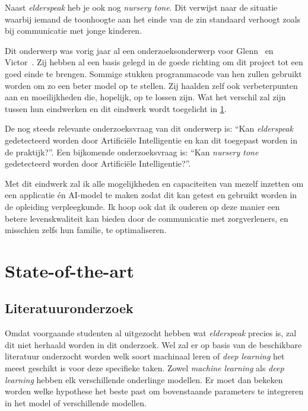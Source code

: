 Naast \textit{elderspeak} heb je ook nog \textit{nursery tone}. Dit verwijst naar de situatie waarbij iemand de toonhoogte aan het einde van de zin standaard verhoogt zoals bij communicatie met jonge kinderen.

Dit onderwerp was vorig jaar al een onderzoeksonderwerp voor Glenn~\textcite{Beeckman2021} en Victor~\textcite{Standaert2021}.
Zij hebben al een basis gelegd in de goede richting om dit project tot een goed einde te brengen.
Sommige stukken programmacode van hen zullen gebruikt worden om zo een beter model op te stellen.
Zij haalden zelf ook verbeterpunten aan en moeilijkheden die, hopelijk, op te lossen zijn. Wat het verschil zal zijn tussen hun eindwerken en dit eindwerk wordt toegelicht in \ref{sec:state-of-the-art}.

De nog steeds relevante onderzoeksvraag van dit onderwerp is: ``Kan \textit{elderspeak} gedetecteerd worden door Artificiële Intelligentie en kan dit toegepast worden in de praktijk?''. Een bijkomende onderzoeksvraag is: ``Kan \textit{nursery tone} gedetecteerd worden door Artificiële Intelligentie?''.

Met dit eindwerk zal ik alle mogelijkheden en capaciteiten van mezelf inzetten om een applicatie én AI-model te maken zodat dit kan getest en gebruikt worden in de opleiding verpleegkunde.
Ik hoop ook dat ik ouderen op deze manier een betere levenskwaliteit kan bieden door de communicatie met zorgverleners, en misschien zelfs hun familie, te optimaliseren.



\section{State-of-the-art}
\label{sec:state-of-the-art}

\subsection{Literatuuronderzoek}\label{subsec:literatuuronderzoek}

Omdat voorgaande studenten al uitgezocht hebben wat \textit{elderspeak} precies is, zal dit niet herhaald worden in dit onderzoek.
Wel zal er op basis van de beschikbare literatuur onderzocht worden welk soort machinaal leren of \textit{deep learning} het meest geschikt is voor deze specifieke taken. Zowel \textit{machine learning} als \textit{deep learning} hebben elk verschillende onderlinge modellen. Er moet dan bekeken worden welke hypothese het beste past om bovenstaande parameters te integreren in het model of verschillende modellen.

